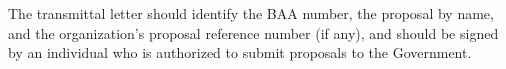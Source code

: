 The transmittal letter should identify the BAA number, the proposal by name, and the
organization’s proposal reference number (if any), and should be signed by an individual
who is authorized to submit proposals to the Government.
